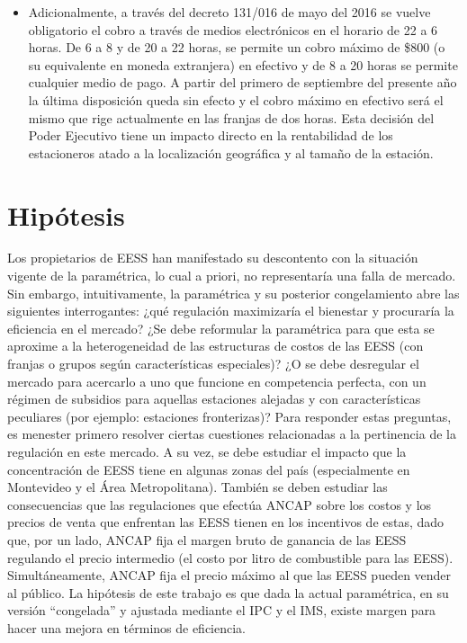 \documentclass[spanish,A4,11pt]{article}
\begin{document}
\begin{itemize}
\item Adicionalmente, a través del decreto 131/016 de mayo del 2016 se vuelve obligatorio el cobro a través de medios electrónicos en el horario de 22 a 6 horas. De 6 a 8 y de 20 a 22 horas, se permite un cobro máximo de \$800 (o su equivalente en moneda extranjera) en efectivo y de 8 a 20 horas se permite cualquier medio de pago. A partir del primero de septiembre del presente año la última disposición queda sin efecto y el cobro máximo en efectivo será el mismo que rige actualmente en las franjas de dos horas. Esta decisión del Poder Ejecutivo tiene un impacto directo en la rentabilidad de los estacioneros atado a la localización geográfica y al tamaño de la estación. 
\end{itemize}

\section{Hipótesis}   
Los propietarios de EESS han manifestado su descontento con la situación vigente de la paramétrica, lo cual a priori, no representaría una falla de mercado. Sin embargo, intuitivamente, la paramétrica y su posterior congelamiento abre las siguientes interrogantes: ¿qué regulación maximizaría el bienestar y procuraría la eficiencia en el mercado? ¿Se debe reformular la paramétrica para que esta se aproxime a la heterogeneidad de las estructuras de costos de las EESS (con franjas o grupos según características especiales)? ¿O se debe desregular el mercado para acercarlo a uno que funcione en competencia perfecta, con un régimen de subsidios para aquellas estaciones alejadas y con características peculiares (por ejemplo: estaciones fronterizas)? Para responder estas preguntas, es menester primero resolver ciertas cuestiones relacionadas a la pertinencia de la regulación en este mercado. A su vez, se debe estudiar el impacto que la concentración de EESS tiene en algunas zonas del país (especialmente en Montevideo y el Área Metropolitana). También se deben estudiar las consecuencias que las regulaciones que efectúa ANCAP sobre los costos y los precios de venta que enfrentan las EESS tienen en los incentivos de estas, dado que, por un lado, ANCAP fija el margen bruto de ganancia de las EESS regulando el precio intermedio (el costo por litro de combustible para las EESS). Simultáneamente, ANCAP fija el precio máximo al que las EESS pueden vender al público. La hipótesis de este trabajo es que dada  la actual paramétrica, en su versión ``congelada'' y ajustada mediante el IPC y el IMS, existe margen para hacer una mejora en términos de eficiencia.
\end{document}
